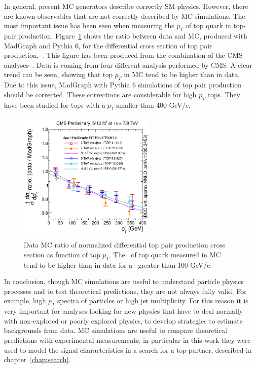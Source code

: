 In general, present MC generators describe correctly SM physics. However, there are known observables that are not correctly described by MC simulations. The most important issue has been seen when measuring the $p_{T}$ of top quark in top-pair production. Figure~\ref{fig:TopPTReweighting} shows the ratio between data and MC, produced with MadGraph and Pythia 6, for the differential cross section of top pair production,~\cite{Goerner:1754332}. This figure has been produced from the combination of the CMS analyses~\cite{Chatrchyan:2012saa,Chatrchyan:2013boa,Khachatryan:2015oqa}. Data is coming from four different analysis performed by CMS. A clear trend can be seen, showing that top $p_{T}$ in MC tend to be higher than in data. Due to this issue, MadGraph with Pythia 6 simulations of top pair production should be corrected. These corrections are considerable for high $p_{T}$ tops. They have been studied for tops with a $p_{T}$ smaller than 400 GeV/c.

\begin{figure}[!Hhtbp]
  \begin{center}
    \includegraphics[width=0.6\textwidth]{figs/topPtDataOverMadgraphPythia.png}
    \caption{Data MC ratio of normalized differential top pair production cross section as function of top $p_{T}$. The \pt~of top quark measured in MC tend to be higher than in data for a \pt~greater than 100 GeV/c.}
    \label{fig:TopPTReweighting}
  \end{center}
\end{figure}

In conclusion, though MC simulations are useful to understand particle physics processes and to test theoretical predictions, they are not always fully valid. For example, high $p_{T}$ spectra of particles or high jet multiplicity. For this reason it is very important for analyses looking for new physics that have to deal normally with non-explored or poorly explored physics, to develop strategies to estimate backgrounds from data. MC simulations are useful to compare theoretical predictions with experimental measurements, in particular in this work they were used to model the signal characteristics in a search for a top-partner, described in chapter~\ref{chap:search}. 